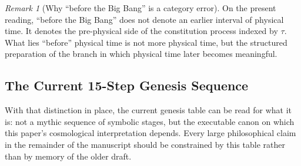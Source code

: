 \documentclass[11pt,a4paper]{article}
\theoremstyle{plain}
\theoremstyle{definition}
\theoremstyle{remark}
\newtheorem{remark}[theorem]{Remark}
\begin{document}
\begin{remark}[Why ``before the Big Bang'' is a category error]
\label{rem:before-big-bang}
On the present reading, ``before the Big Bang'' does not denote an earlier interval of physical time.
It denotes the pre-physical side of the constitution process indexed by $\tau$.
What lies ``before'' physical time is not more physical time, but the structured preparation of the branch in which physical time later becomes meaningful.
\end{remark}

\subsection{The Current 15-Step Genesis Sequence}
\label{subsec:genesis-table}

With that distinction in place, the current genesis table can be read for what it is: not a mythic sequence of symbolic stages, but the executable canon on which this paper's cosmological interpretation depends.
Every large philosophical claim in the remainder of the manuscript should be constrained by this table rather than by memory of the older draft.
\end{document}
